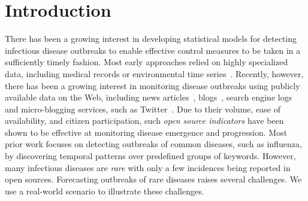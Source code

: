 \documentclass[twoside,leqno,twocolumn]{article}
\newcommand{\fullmodel}{{{\sf SourceSeer}}\xspace}
\begin{document}
\maketitle
\begin{abstract}
Rapidly increasing volumes of news feeds from diverse data sources, such as online newspapers, Twitter and online blogs are proving to be extremely valuable resources in helping anticipate, detect, and forecast outbreaks of rare diseases. This paper presents \fullmodel, a novel algorithmic framework that combines spatio-temporal topic models with source-based anomaly detection techniques to effectively forecast the emergence and progression of infectious rare diseases. \fullmodel is capable of discovering the location focus of each source allowing sources to be used as experts with varying degrees of authoritativeness. To fuse the individual source predictions into a final outbreak prediction we employ a multiplicative weights algorithm taking into account the accuracy of each source. We evaluate the performance of \fullmodel using incidence data for hantavirus syndromes in multiple countries of Latin America provided by HealthMap over a timespan of fifteen months. We demonstrate that \fullmodel makes predictions of increased accuracy compared to several baselines and is capable of forecasting disease outbreaks in a timely manner even when no outbreaks were previously reported.  
\end{abstract}

\vspace{-10pt}
\section{Introduction}
\label{sec:intro}
There has been a growing interest in developing statistical models for detecting infectious disease outbreaks to enable effective control measures to be taken in a sufficiently timely fashion. Most early approaches relied on highly specialized data, including medical records or environmental time series~\cite{wong:02,wong:03}.  Recently, however, there has been a growing interest in monitoring disease outbreaks using publicly available data on the Web, including news articles~\cite{brownstein:2008,linge:09}, blogs~\cite{corley:10}, search engine logs~\cite{ginsberg:09} and micro-blogging services, such as Twitter~\cite{culotta:2010, paul:11, parker:13}. Due to their volume, ease of availability, and citizen participation, such {\em open source indicators} have been shown to be effective at monitoring disease emergence and progression. Most prior work focuses on detecting outbreaks of common diseases, such as influenza, by discovering temporal patterns over predefined groups of keywords. However, many infectious diseases are {\em rare} with only a few incidences being reported in open sources. Forecasting outbreaks of rare diseases raises several challenges. We use a real-world scenario to illustrate these challenges.
\vspace{-10pt}
\end{document}
